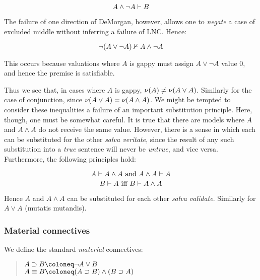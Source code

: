 \[ {A \wedge \neg A}\vdash{B} \]

\noindent The failure of one direction of DeMorgan, however, allows one to \emph{negate} a case of excluded middle without inferring a failure of LNC. Hence:

\[ {\neg(A\vee\neg A)}\nvdash{A\wedge\neg A} \]

\noindent This occurs because valuations where $A$ is gappy must assign $A \vee \neg A$ value $0$, and hence the premise is satisfiable. 

Thus we see that, in cases where $A$ is gappy, $\mathcal{\nu}({A})\neq\mathcal{\nu}({A \vee A})$. Similarly for the case of conjunction, since $\mathcal{\nu}({A \vee A}) = \mathcal{\nu}({A \wedge A})$. We might be tempted to consider these inequalities a failure of an important substitution principle. Here, though, one must be somewhat careful. It is true that there are models where $A$ and $A \wedge A$ do not receive the same value. However, there is a sense in which each can be substituted for the other \emph{salva veritate}, since the result of any such substitution into a \emph{true} sentence will never be \emph{untrue}, and vice versa. Furthermore, the following principles hold:

\[ {A}\vdash{A \wedge A} \mbox{ and } {A \wedge A}\vdash{A} \]
\[ {B}\vdash{A} \mbox{ iff } {B}\vdash{A \wedge A} \]
 
\noindent Hence $A$ and $A \wedge A$ can be substituted for each other \emph{salva validate}. Similarly for $A \vee A$ (mutatis mutandis).

\subsubsection{Material connectives}\label{materialConnectives}

\noindent We define the standard \emph{material} connectives:

\begin{quote}
 $ A \supset B \Defined \neg A \vee B $ \\
 $ A \equiv B \Defined (A \supset B) \wedge (B \supset A) $
\end{quote}

